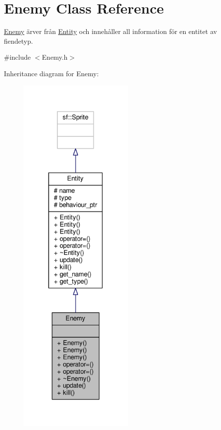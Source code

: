 \hypertarget{classEnemy}{\section{Enemy Class Reference}
\label{classEnemy}
}


\hyperlink{classEnemy}{Enemy} ärver från \hyperlink{classEntity}{Entity} och innehåller all information för en entitet av fiendetyp.  




{\ttfamily \#include $<$Enemy.\+h$>$}



Inheritance diagram for Enemy\+:\nopagebreak
\begin{figure}[H]
\begin{center}
\leavevmode
\includegraphics[width=162pt]{classEnemy__inherit__graph}
\end{center}
\end{figure}


